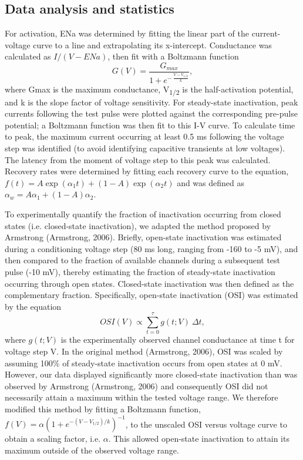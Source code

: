 \subsection{Data analysis and statistics}
For activation, ENa was determined by fitting the linear part of the current-voltage curve to a line and extrapolating its x-intercept. Conductance was calculated as $I/(V-ENa)$, then fit with a Boltzmann function
\begin{equation}
G\left(V\right)=\frac{G_{max}}{1+e^{-\ \frac{V-V_{1/2}}{k}}},
\end{equation}
where Gmax is the maximum conductance, V\textsubscript{1/2} is the half-activation potential, and k is the slope factor of voltage sensitivity. For steady-state inactivation, peak currents following the test pulse were plotted against the corresponding pre-pulse potential; a Boltzmann function was then fit to this I-V curve. To calculate time to peak, the maximum current occurring at least 0.5 ms following the voltage step was identified (to avoid identifying capacitive transients at low voltages). The latency from the moment of voltage step to this peak was calculated. Recovery rates were determined by fitting each recovery curve to the equation, $f\left(t\right)=A\exp{(\alpha_1t)}+\left(1-A\right)\exp{\left(\alpha_2t\right)}$ and was defined as $\alpha_w=A\alpha_1+\left(1-A\right)\alpha_2$.

To experimentally quantify the fraction of inactivation occurring from closed states (i.e. closed-state inactivation), we adapted the method proposed by Armstrong (Armstrong, 2006). Briefly, open-state inactivation was estimated during a conditioning voltage step (80 ms long, ranging from -160 to -5 mV), and then compared to the fraction of available channels during a subsequent test pulse (-10 mV), thereby estimating the fraction of steady-state inactivation occurring through open states. Closed-state inactivation was then defined as the complementary fraction. Specifically, open-state inactivation (OSI) was estimated by the equation
\begin{equation}
OSI\left(V\right)\propto\sum_{t=0}^{\tau}{g\left(t;V\right)\ \Delta t},
\end{equation}
where $g(t;V)$ is the experimentally observed channel conductance at time t for voltage step V. In the original method (Armstrong, 2006), OSI was scaled by assuming 100\% of steady-state inactivation occurs from open states at 0 mV. However, our data displayed significantly more closed-state inactivation than was observed by Armstrong (Armstrong, 2006) and consequently OSI did not necessarily attain a maximum within the tested voltage range. We therefore modified this method by fitting a Boltzmann function, $f\left(V\right)=\alpha\left(1+e^{-\left(V-V_{1/2}\right)/k}\right)^{-1}$, to the unscaled OSI versus voltage curve to obtain a scaling factor, i.e. $\alpha$. This allowed open-state inactivation to attain its maximum outside of the observed voltage range.

